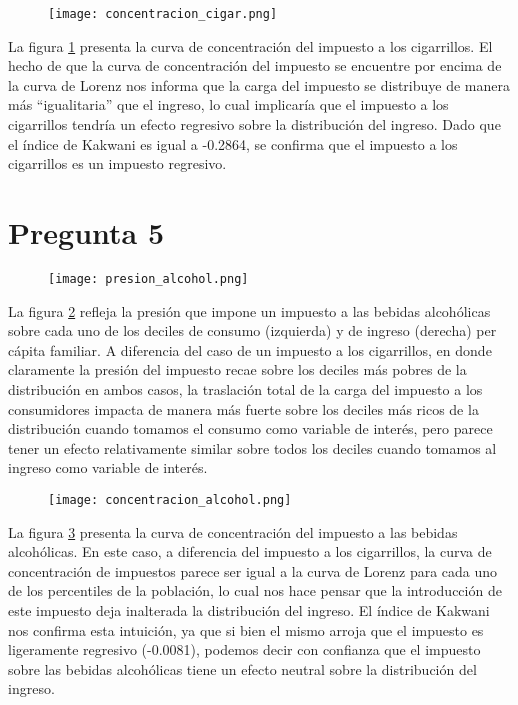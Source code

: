\documentclass[11pt,oneside]{article}
\begin{document}
	\begin{figure}
    		\centering
    		\texttt{[image: concentracion\_cigar.png]}
    		\label{fig:4B}
	\end{figure}

	La figura \ref{fig:4B} presenta la curva de concentración del impuesto a los cigarrillos. El hecho de que la curva de concentración del impuesto se encuentre por encima de la curva de Lorenz nos informa que la carga del impuesto se distribuye de manera más ``igualitaria'' que el ingreso, lo cual implicaría que el impuesto a los cigarrillos tendría un efecto regresivo sobre la distribución del ingreso. Dado que el índice de Kakwani es igual a -0.2864, se confirma que el impuesto a los cigarrillos es un impuesto regresivo.
 
	
 	\section*{Pregunta 5}

 	\begin{figure}
    		\centering
    		\texttt{[image: presion\_alcohol.png]}
    		\label{fig:5A}
	\end{figure}

	La figura \ref{fig:5A} refleja la presión que impone un impuesto a las bebidas alcohólicas sobre cada uno de los deciles de consumo (izquierda) y de ingreso (derecha) per cápita familiar. A diferencia del caso de un impuesto a los cigarrillos, en donde claramente la presión del impuesto recae sobre los deciles más pobres de la distribución en ambos casos, la traslación total de la carga del impuesto a los consumidores impacta de manera más fuerte sobre los deciles más ricos de la distribución cuando tomamos el consumo como variable de interés, pero parece tener un efecto relativamente similar sobre todos los deciles cuando tomamos al ingreso como variable de interés.

	\begin{figure}
    		\centering
    		\texttt{[image: concentracion\_alcohol.png]}
    		\label{fig:5B}
	\end{figure}

	La figura \ref{fig:5B} presenta la curva de concentración del impuesto a las bebidas alcohólicas. En este caso, a diferencia del impuesto a los cigarrillos, la curva de concentración de impuestos parece ser igual a la curva de Lorenz para cada uno de los percentiles de la población, lo cual nos hace pensar que la introducción de este impuesto deja inalterada la distribución del ingreso. El índice de Kakwani nos confirma esta intuición, ya que si bien el mismo arroja que el impuesto es ligeramente regresivo (-0.0081), podemos decir con confianza que el impuesto sobre las bebidas alcohólicas tiene un efecto neutral sobre la distribución del ingreso.
 
\end{document}
